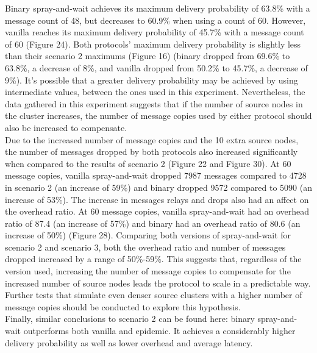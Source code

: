 \documentclass{article}
\begin{document}
\newline Binary spray-and-wait achieves its maximum delivery probability of 63.8\% with a message count of 48, but decreases to 60.9\% when using a count of 60. However, vanilla reaches its maximum delivery probability of 45.7\% with a message count of 60 (Figure 24). Both protocols' maximum delivery probability is slightly less than their scenario 2 maximums (Figure 16) (binary dropped from 69.6\% to 63.8\%, a decrease of 8\%, and vanilla dropped from 50.2\% to 45.7\%, a decrease of 9\%). It's possible that a greater delivery probability may be achieved by using intermediate values, between the ones used in this experiment. Nevertheless, the data gathered in this experiment suggests that if the number of source nodes in the cluster increases, the number of message copies used by either protocol should also be increased to compensate.\\
\newline Due to the increased number of message copies and the 10 extra source nodes, the number of messages dropped by both protocols also increased significantly when compared to the results of scenario 2 (Figure 22 and Figure 30). At 60 message copies, vanilla spray-and-wait dropped 7987 messages compared to 4728 in scenario 2 (an increase of 59\%) and binary dropped 9572 compared to 5090 (an increase of 53\%). The increase in messages relays and drops also had an affect on the overhead ratio. At 60 message copies, vanilla spray-and-wait had an overhead ratio of 87.4 (an increase of 57\%) and binary had an overhead ratio of 80.6 (an increase of 50\%) (Figure 28). Comparing both versions of spray-and-wait for scenario 2 and scenario 3, both the overhead ratio and number of messages dropped increased by a range of 50\%-59\%. This suggests that, regardless of the version used, increasing the number of message copies to compensate for the increased number of source nodes leads the protocol to scale in a predictable way. Further tests that simulate even denser source clusters with a higher number of message copies should be conducted to explore this hypothesis.\\
\newline Finally, similar conclusions to scenario 2 can be found here: binary spray-and-wait outperforms both vanilla and epidemic. It achieves a considerably higher delivery probability as well as lower overhead and average latency.

\end{document}

